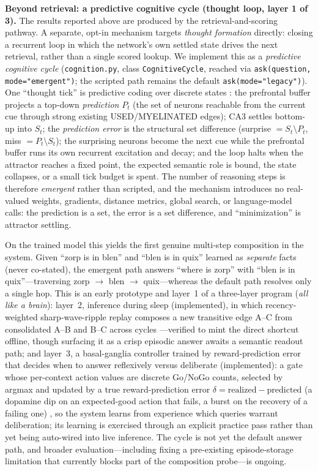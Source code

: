 \documentclass[11pt]{article}
\begin{document}
\textbf{Beyond retrieval: a predictive cognitive cycle (thought loop, layer 1 of 3).}
The results reported above are produced by the retrieval-and-scoring pathway. A
separate, opt-in mechanism targets \emph{thought formation} directly: closing a
recurrent loop in which the network's own settled state drives the next retrieval,
rather than a single scored lookup. We implement this as a \emph{predictive
cognitive cycle} (\texttt{cognition.py}, class \texttt{CognitiveCycle}, reached via
\texttt{ask(question, mode="emergent")}; the scripted path remains the default
\texttt{ask(mode="legacy")}). One ``thought tick'' is predictive coding over
discrete states \citep{rao1999predictive,preston2013interplay,wang2001synaptic}:
the prefrontal buffer projects a top-down \emph{prediction} $P_t$ (the set of
neurons reachable from the current cue through strong existing USED/MYELINATED
edges); CA3 settles bottom-up into $S_t$; the \emph{prediction error} is the
structural set difference (surprise $= S_t \setminus P_t$, miss $= P_t \setminus
S_t$); the surprising neurons become the next cue while the prefrontal buffer runs
its own recurrent excitation and decay; and the loop halts when the attractor
reaches a fixed point, the expected semantic role is bound, the state collapses, or
a small tick budget is spent. The number of reasoning steps is therefore
\emph{emergent} rather than scripted, and the mechanism introduces no real-valued
weights, gradients, distance metrics, global search, or language-model calls: the
prediction is a set, the error is a set difference, and ``minimization'' is
attractor settling.

On the trained model this yields the first genuine multi-step composition in the
system. Given ``zorp is in blen'' and ``blen is in quix'' learned as \emph{separate}
facts (never co-stated), the emergent path answers ``where is zorp'' with ``blen is
in quix''---traversing zorp $\rightarrow$ blen $\rightarrow$ quix---whereas the
default path resolves only a single hop. This is an early prototype and layer~1 of a
three-layer program (\textit{all like a brain}): layer~2, inference during sleep
(implemented), in which recency-weighted sharp-wave-ripple replay composes a new
transitive edge A--C from consolidated A--B and B--C across cycles
\citep{kumaran2012inference}---verified to mint the direct shortcut offline,
though surfacing it as a crisp episodic answer awaits a semantic readout path; and
layer~3, a basal-ganglia controller trained by reward-prediction error that decides
when to answer reflexively versus deliberate (implemented): a gate whose per-context
action values are discrete Go/NoGo counts, selected by argmax and updated by a true
reward-prediction error $\delta = \text{realized} - \text{predicted}$ (a dopamine dip
on an expected-good action that fails, a burst on the recovery of a failing one)
\citep{schultz1998predictive}, so the system learns from experience
which queries warrant deliberation; its learning is exercised through an explicit
practice pass rather than yet being auto-wired into live inference. The cycle is not yet the
default answer path, and broader evaluation---including fixing a pre-existing
episode-storage limitation that currently blocks part of the composition
probe---is ongoing.
\end{document}
